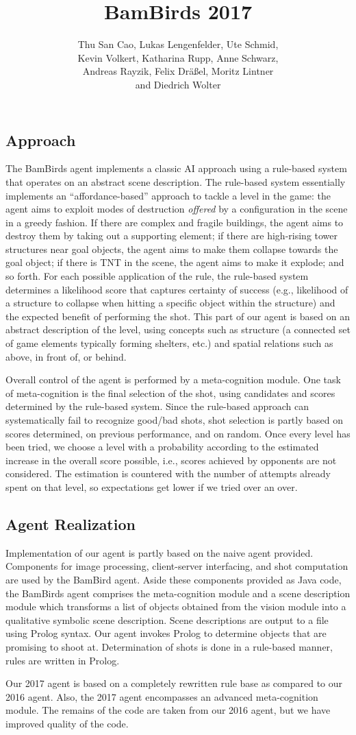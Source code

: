 \documentclass[DIV13]{scrartcl}
\title{BamBirds 2017}
\author{Thu San Cao, Lukas Lengenfelder, Ute Schmid, \\ Kevin Volkert, Katharina Rupp, Anne Schwarz, \\ Andreas Rayzik, Felix Dräßel, Moritz Lintner \\ and  Diedrich Wolter}
\date{}
\begin{document}
\thispagestyle{empty}
\maketitle

\subsection*{Approach}
The BamBirds agent implements a classic AI approach using a rule-based system that operates on an abstract scene description. 
The rule-based system essentially implements an ``affordance-based'' approach to tackle a level in the game: the agent aims to exploit modes of destruction {\em offered} by a configuration in the scene in a greedy fashion. 
If there are complex and fragile buildings, the agent aims to destroy them by taking out a supporting element; if there are high-rising tower structures near goal objects, the agent aims to make them collapse towards the goal object; if there is TNT in the scene, the agent aims to make it explode; and so forth.
For each possible application of the rule, the rule-based system determines a likelihood score that captures certainty of success (e.g., likelihood of a structure to collapse when hitting a specific object within the structure) and the expected benefit of performing the shot. 
This part of our agent is based on an abstract description of the level, using concepts such as structure (a connected set of game elements typically forming shelters, etc.) and spatial relations such as above, in front of, or behind.

Overall control of the agent is performed by a meta-cognition module. 
One task of meta-cognition is the final selection of the shot, using candidates and scores determined by the rule-based system. 
Since the rule-based approach can systematically fail to recognize good/bad shots, shot selection is partly based on scores determined, on previous performance, and on random. 
Once every level has been tried, we choose a level with a probability according to the estimated increase in the overall score possible, i.e., scores achieved by opponents are not considered.  
The estimation is countered with the number of attempts already spent on that level, so expectations get lower if we tried over an over.

\subsection*{Agent Realization}
Implementation of our agent is partly based on the naive agent provided.
Components for image processing, client-server interfacing, and shot computation are used by the BamBird agent. 
Aside these components provided as Java code, the BamBirds agent comprises the meta-cognition module and a scene description module which transforms a list of objects obtained from the vision module into a qualitative symbolic scene description.
Scene descriptions are output to a file using Prolog syntax. 
Our agent invokes Prolog to determine objects that are promising to shoot at.
Determination of shots is done in a rule-based manner, rules are written in Prolog.

Our 2017 agent is based on a completely rewritten rule base as compared to our 2016 agent.
Also, the 2017 agent encompasses an advanced meta-cognition module. 
The remains of the code are taken from our 2016 agent, but we have improved quality of the code.
\end{document}
